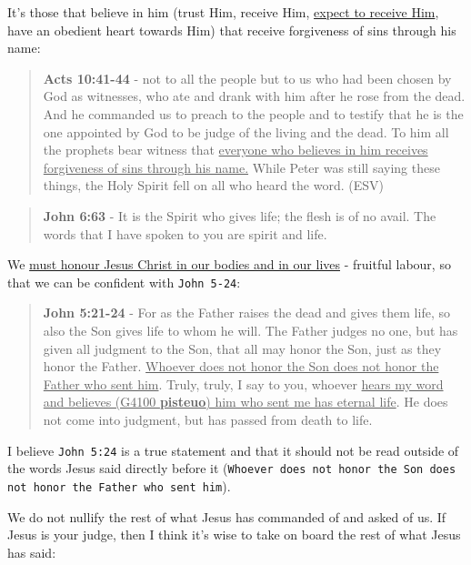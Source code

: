 \documentclass[11pt]{article}
\begin{document}
It's those that believe in him (trust Him, receive Him, \uline{expect to receive Him}, have an obedient heart towards Him) that receive forgiveness of sins through his name:

\begin{quote}
\textbf{Acts 10:41-44} - not to all the people but to us who had been chosen by God as witnesses, who ate and drank with him after he rose from the dead. And he commanded us to preach to the people and to testify that he is the one appointed by God to be judge of the living and the dead. To him all the prophets bear witness that \uline{everyone who believes in him receives forgiveness of sins through his name.} While Peter was still saying these things, the Holy Spirit fell on all who heard the word. (ESV)
\end{quote}

\begin{quote}
\textbf{John 6:63} - It is the Spirit who gives life; the flesh is of no avail. The words that I have spoken to you are spirit and life.
\end{quote}

We \uline{must honour Jesus Christ in our bodies and in our lives} - fruitful labour, so that we can be confident with \texttt{John 5-24}:

\begin{quote}
\textbf{John 5:21-24} - For as the Father raises the dead and gives them life, so also the Son gives life to whom he will. The Father judges no one, but has given all judgment to the Son, that all may honor the Son, just as they honor the Father. \uline{Whoever does not honor the Son does not honor the Father who sent him}. Truly, truly, I say to you, whoever \uline{hears my word and believes (G4100 \textbf{pisteuo}) him who sent me has eternal life}. He does not come into judgment, but has passed from death to life.
\end{quote}

I believe \texttt{John 5:24} is a true statement and that it should not be read outside of the words Jesus said directly before it (\texttt{Whoever does not honor the Son does not honor the Father who sent him}).

We do not nullify the rest of what Jesus has commanded of and asked of us. If Jesus is your judge, then I think it's wise to take on board the rest of what Jesus has said:
\end{document}
